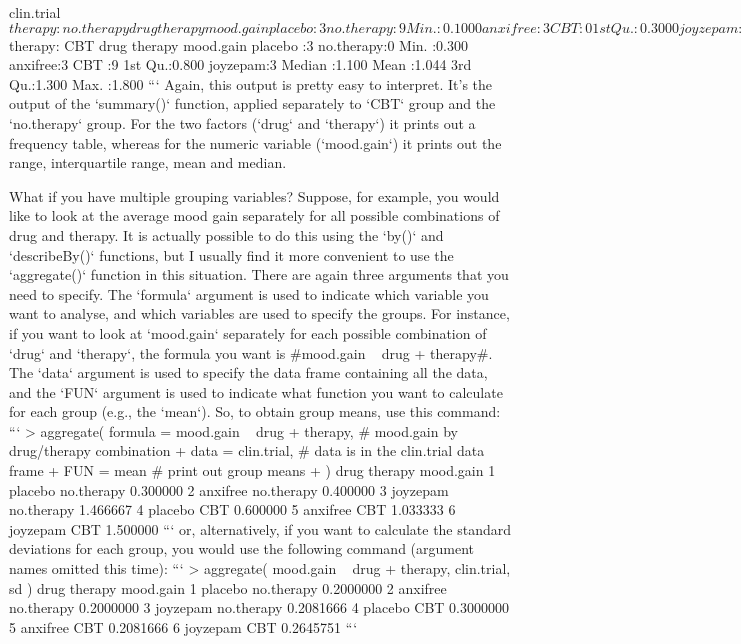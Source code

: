 clin.trial$therapy: no.therapy
       drug         therapy    mood.gain     
 placebo :3   no.therapy:9   Min.   :0.1000  
 anxifree:3   CBT       :0   1st Qu.:0.3000  
 joyzepam:3                  Median :0.5000  
                             Mean   :0.7222  
                             3rd Qu.:1.3000  
                             Max.   :1.7000  
---------------------------------------------------------------------------------- 
clin.trial$therapy: CBT
       drug         therapy    mood.gain    
 placebo :3   no.therapy:0   Min.   :0.300  
 anxifree:3   CBT       :9   1st Qu.:0.800  
 joyzepam:3                  Median :1.100  
                             Mean   :1.044  
                             3rd Qu.:1.300  
                             Max.   :1.800  
```
Again, this output is pretty easy to interpret. It's the output of the `summary()` function, applied separately to `CBT` group and the `no.therapy` group. For the two factors (`drug` and `therapy`) it prints out a frequency table, whereas for the numeric variable (`mood.gain`) it prints out the range, interquartile range, mean and median.

What if you have multiple grouping variables? Suppose, for example, you would like to look at the average mood gain separately for all possible combinations of drug and therapy. It is actually possible to do this using the `by()` and `describeBy()` functions, but I usually find it more convenient to use the `aggregate()` function in this situation. There are again three arguments that you need to specify. The `formula` argument is used to indicate which variable you want to analyse, and which variables are used to specify the groups. For instance, if you want to look at `mood.gain` separately for each possible combination of `drug` and `therapy`, the formula you want is \rtextverb#mood.gain ~ drug + therapy#. The `data` argument is used to specify the data frame containing all the data, and the `FUN` argument is used to indicate what function you want to calculate for each group (e.g., the `mean`). So, to obtain group means, use this command:
```
> aggregate( formula = mood.gain ~ drug + therapy,  # mood.gain by drug/therapy combination
+            data = clin.trial,                     # data is in the clin.trial data frame
+            FUN = mean                             # print out group means
+ )
      drug    therapy mood.gain
1  placebo no.therapy  0.300000
2 anxifree no.therapy  0.400000
3 joyzepam no.therapy  1.466667
4  placebo        CBT  0.600000
5 anxifree        CBT  1.033333
6 joyzepam        CBT  1.500000
```
or, alternatively, if you want to calculate the standard deviations for each group, you would use the following command (argument names omitted this time):
```
> aggregate( mood.gain ~ drug + therapy, clin.trial, sd )
      drug    therapy mood.gain
1  placebo no.therapy 0.2000000
2 anxifree no.therapy 0.2000000
3 joyzepam no.therapy 0.2081666
4  placebo        CBT 0.3000000
5 anxifree        CBT 0.2081666
6 joyzepam        CBT 0.2645751
```




